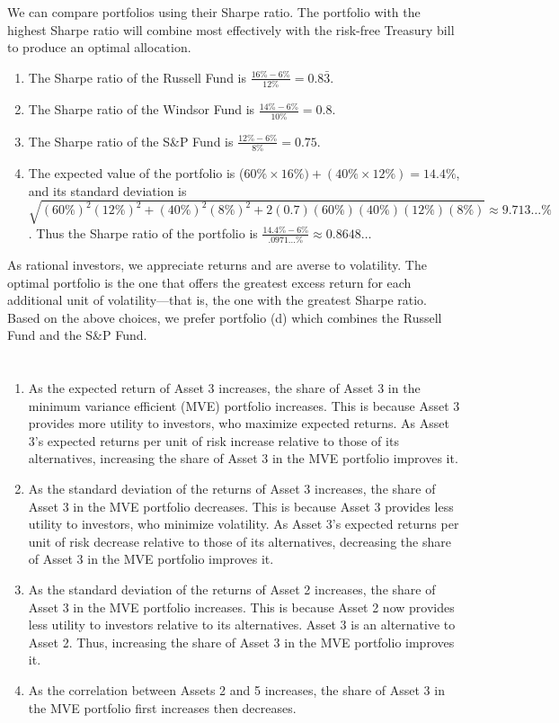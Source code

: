 \documentclass[12pt]{article}
\begin{document}
\section{}
We can compare portfolios using their Sharpe ratio. The portfolio with the highest Sharpe ratio will combine most effectively with the risk-free Treasury bill to produce an optimal allocation.

\begin{enumerate}
    \item The Sharpe ratio of the Russell Fund is $\frac{16\%-6\%}{12\%}=0.8\bar{3}.$
    \item The Sharpe ratio of the Windsor Fund is $\frac{14\%-6\%}{10\%}=0.8.$
    \item The Sharpe ratio of the S\&P Fund is $\frac{12\%-6\%}{8\%}=0.75.$
    \item The expected value of the portfolio is ($60\%\times 16\%)+(40\%\times 12\%)=14.4\%$, and its standard deviation is $\sqrt{(60\%)^2(12\%)^2+(40\%)^2(8\%)^2+2(0.7)(60\%)(40\%)(12\%)(8\%)}\approx 9.713\dots\%$. Thus the Sharpe ratio of the portfolio is $\frac{14.4\%-6\%}{.0971\dots\%}\approx 0.8648\dots$
\end{enumerate}
As rational investors, we appreciate returns and are averse to volatility. The optimal portfolio is the one that offers the greatest excess return for each additional unit of volatility---that is, the one with the greatest Sharpe ratio. Based on the above choices, we prefer portfolio (d) which combines the Russell Fund and the S\&P Fund.
\section{}
\begin{enumerate}
    \item As the expected return of Asset 3 increases, the share of Asset 3 in the minimum variance efficient (MVE) portfolio increases. This is because Asset 3 provides more utility to investors, who maximize expected returns. As Asset 3's expected returns per unit of risk increase relative to those of its alternatives, increasing the share of Asset 3 in the MVE portfolio improves it. 
    \item As the standard deviation of the returns of Asset 3 increases, the share of Asset 3 in the MVE portfolio decreases. This is because Asset 3 provides less utility to investors, who minimize volatility. As Asset 3's expected returns per unit of risk decrease relative to those of its alternatives, decreasing the share of Asset 3 in the MVE portfolio improves it.
    \item As the standard deviation of the returns of Asset 2 increases, the share of Asset 3 in the MVE portfolio increases. This is because Asset 2 now provides less utility to investors relative to its alternatives. Asset 3 is an alternative to Asset 2. Thus, increasing the share of Asset 3 in the MVE portfolio improves it.
    \item As the correlation between Assets 2 and 5 increases, the share of Asset 3 in the MVE portfolio first increases then decreases.
\end{enumerate}
\end{document}
